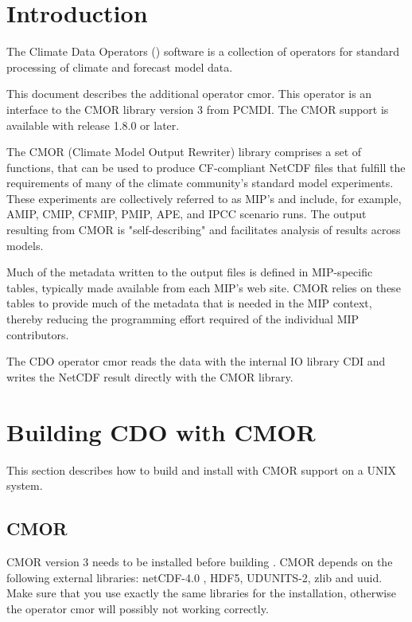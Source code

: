 \chapter{Introduction}

The Climate Data Operators ({\CDO}) software is a collection of operators
for standard processing of climate and forecast model data.

This document describes the additional {\CDO} operator cmor. This
operator is an interface to the CMOR library version 3 from PCMDI.
The CMOR support is available with {\CDO} release 1.8.0 or later.

The CMOR (Climate Model Output Rewriter) library comprises a set of
functions, that can be used to produce CF-compliant NetCDF files that 
fulfill the requirements of many of the climate community's standard
model experiments. These experiments are collectively referred to as
MIP's and include, for example, AMIP, CMIP, CFMIP, PMIP, APE, and IPCC 
scenario runs. The output resulting from CMOR is "self-describing" and
facilitates analysis of results across models.

Much of the metadata written to the output files is defined in
MIP-specific tables, typically made available from each MIP's web
site. CMOR relies on these tables to provide much of the metadata 
that is needed in the MIP context, thereby reducing the programming 
effort required of the individual MIP contributors.

The CDO operator cmor reads the data with the internal IO library CDI
and writes the NetCDF result directly with the CMOR library. 

\chapter{Building CDO with CMOR}

This section describes how to build and install {\CDO} with CMOR
support on a UNIX system.

\section{CMOR}
 
CMOR version 3 needs to be installed before building {\CDO}.
CMOR depends on the following external libraries:
netCDF-4.0 , HDF5, UDUNITS-2, zlib and uuid.
Make sure that you use exactly the same libraries for the {\CDO}
installation, otherwise the operator cmor will possibly not working correctly.

